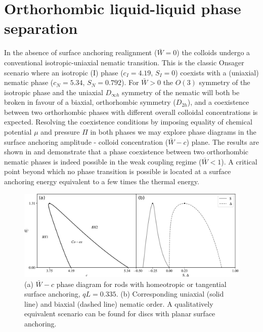    \section{Orthorhombic liquid-liquid phase separation}

In the absence of surface anchoring realignment ($\bar{W} = 0$) the colloids undergo a conventional isotropic-uniaxial nematic transition. This is the classic Onsager scenario where an isotropic (I) phase  ($c_{I} = 4.19$, $S_{I} =0$) coexists with a (uniaxial) nematic phase  ($c_{N} = 5.34$, $S_{N} =0.792$). For $\bar{W} >0$ the $O(3)$ symmetry of the isotropic phase and the uniaxial $D_{\infty h}$ symmetry of the nematic will both be broken in favour of a biaxial, orthorhombic symmetry ($D_{2h}$), and a coexistence between two orthorhombic phases with different overall colloidal concentrations is expected. Resolving the coexistence conditions by imposing equality of chemical potential $\mu$ and pressure $\Pi$ in both phases we may explore phase diagrams in the surface anchoring amplitude - colloid concentration ($\bar{W} - c$) plane. The results are shown in  and demonstrate that a phase coexistence between two orthorhombic nematic phases is indeed possible in the weak coupling regime ($\bar{W} <1$). A critical point beyond which no phase transition is possible is located at a surface anchoring energy equivalent to a few times the thermal energy.

   \begin{figure}
	\includegraphics[width = .9\columnwidth]{figures/chapter-4/diagrams_q0.335_horizontal}
	\caption{(a) $\bar{W} - c $ phase diagram for rods with homeotropic or tangential surface anchoring, $qL = 0.335$. (b) Corresponding uniaxial (solid line) and biaxial (dashed line) nematic order. A qualitatively equivalent scenario can be found for discs with planar surface anchoring.}
	\label{phdiag}
\end{figure}


